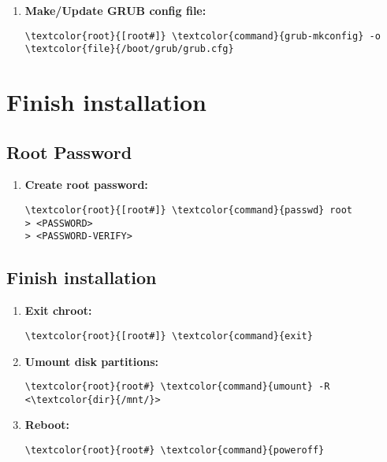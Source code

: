 \documentclass[10pt, a4paper, onecolumn, openany]{book} %
\begin{document}
\begin{enumerate}
\begin{enumerate}
\begin{Verbatim}[commandchars=\\\{\}]
...
GRUB_CMDLINE_LINUX="cryptdevice=UUID=<UUID>:<luks_lvm> \char92 
root=</dev/vg0/root> \textcolor{file}{cryptkey=rootfs:/root/.luks/key}"
...
GRUB_ENABLE_CRYPTODISK=y
...
\end{Verbatim}
    \item \textbf{Make/Update GRUB config file:}
\begin{Verbatim}[commandchars=\\\{\}]
\textcolor{root}{[root#]} \textcolor{command}{grub-mkconfig} -o \textcolor{file}{/boot/grub/grub.cfg}
\end{Verbatim}
    \end{enumerate}
\end{enumerate}
\section{Finish installation}
\subsection{Root Password}
\begin{enumerate}
    \item \textbf{Create root password:}
\begin{Verbatim}[commandchars=\\\{\}]
\textcolor{root}{[root#]} \textcolor{command}{passwd} root
> <PASSWORD>
> <PASSWORD-VERIFY>
\end{Verbatim}
\end{enumerate}
\subsection{Finish installation}
\begin{enumerate}
    \item \textbf{Exit chroot:}
\begin{Verbatim}[commandchars=\\\{\}]
\textcolor{root}{[root#]} \textcolor{command}{exit}
\end{Verbatim}
    \item \textbf{Umount disk partitions:}
\begin{Verbatim}[commandchars=\\\{\}]
\textcolor{root}{root#} \textcolor{command}{umount} -R <\textcolor{dir}{/mnt/}>
\end{Verbatim}
    \item \textbf{Reboot:}
\begin{Verbatim}[commandchars=\\\{\}]
\textcolor{root}{root#} \textcolor{command}{poweroff}
\end{Verbatim}
\end{enumerate}
\end{document}

